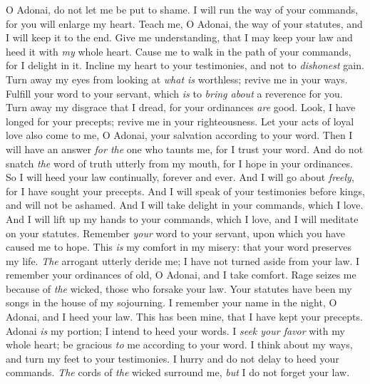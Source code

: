 \begin{biblechapter}
O Adonai, do not let me be put to shame.
\verse I will run the way of your commands, 
for you will enlarge my heart.
 Teach me, O Adonai, the way of your statutes, 
and I will keep it to the end.
\verse Give me understanding, that I may keep your law 
and heed it with \textit{my} whole heart.
\verse Cause me to walk in the path of your commands, 
for I delight in it.
\verse Incline my heart to your testimonies, 
and not to \textit{dishonest} gain.
\verse Turn away my eyes from looking at \textit{what is} worthless; 
revive me in your ways.
\verse Fulfill your word to your servant, 
which \textit{is} to \textit{bring about} a reverence for you.
\verse Turn away my disgrace that I dread, 
for your ordinances \textit{are} good.
\verse Look, I have longed for your precepts; 
revive me in your righteousness.
 Let your acts of loyal love also come to me, O Adonai, 
your salvation according to your word.
\verse Then I will have an answer \textit{for the} one who taunts me, 
for I trust your word.
\verse And do not snatch \textit{the} word of truth utterly from my mouth, 
for I hope in your ordinances.
\verse So I will heed your law continually, 
forever and ever.
\verse And I will go about \textit{freely}, 
for I have sought your precepts.
\verse And I will speak of your testimonies before kings, 
and will not be ashamed.
\verse And I will take delight in your commands, 
which I love.
\verse And I will lift up my hands to your commands, which I love, 
and I will meditate on your statutes.
 Remember \textit{your} word to your servant, 
upon which you have caused me to hope.
\verse This \textit{is} my comfort in my misery: 
that your word preserves my life.
\verse \textit{The} arrogant utterly deride me; 
I have not turned aside from your law.
\verse I remember your ordinances of old, O Adonai, 
and I take comfort.
\verse Rage seizes me because of \textit{the} wicked, 
those who forsake your law.
\verse Your statutes have been my songs 
in the house of my sojourning.
\verse I remember your name in the night, O Adonai, 
and I heed your law.
\verse This has been mine, 
that I have kept your precepts.
 Adonai \textit{is} my portion; 
I intend to heed your words.
\verse I \textit{seek your favor} with my whole heart; 
be gracious \textit{to} me according to your word.
\verse I think about my ways, 
and turn my feet to your testimonies.
\verse I hurry and do not delay 
to heed your commands.
\verse \textit{The} cords of \textit{the} wicked surround me, 
\textit{but} I do not forget your law.

\end{biblechapter}
